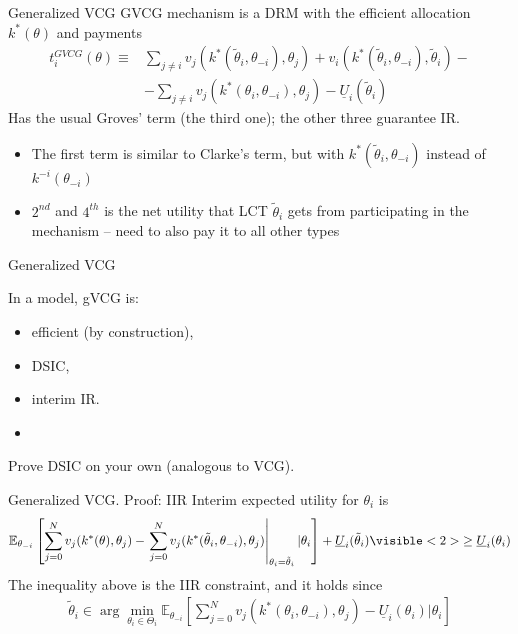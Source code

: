 \documentclass[english,10pt
,aspectratio=169
]{beamer}
\begin{document}
\begin{frame}{Generalized VCG}
	GVCG mechanism is a DRM with the efficient allocation $k^*(\theta)$ and payments
	\begin{align*}
	t_i^{GVCG} (\theta) \equiv& \sum_{j \neq i} v_j (k^*(\tilde{\theta}_i,\theta_{-i}),\theta_j) + v_i (k^*(\tilde{\theta}_i,\theta_{-i}),\tilde{\theta}_i) -
	\\& - \sum_{j \neq i} v_j (k^*(\theta_i,\theta_{-i}),\theta_j) - \underline{U}_i (\tilde{\theta}_i)
	\end{align*}
	\pause
	Has the usual Groves' term (the third one); the other three guarantee IR.
	\begin{itemize}
		\item The first term is similar to Clarke's term, but with $k^*(\tilde{\theta}_i,\theta_{-i})$ instead of $k^{-i}(\theta_{-i})$
		\item $2^{nd}$ and $4^{th}$ is the net utility that LCT $\tilde{\theta}_i$ gets from participating in the mechanism -- need to also pay it to all other types
	\end{itemize}
\end{frame}


\begin{frame}{Generalized VCG}
	\begin{theorem}
		In a  model, gVCG is:
		\begin{itemize}
			\item efficient (by construction),
			\item DSIC,
			\item interim IR.
			\item %
		\end{itemize}
	\end{theorem}
	Prove DSIC on your own (analogous to VCG).
\end{frame}


\begin{frame}{Generalized VCG. Proof: IIR}
	Interim expected utility for $\theta_i$ is
	\begin{align*}
		\mathbb{E}_{\theta_{-i}} \left[ \sum_{j =0}^N v_j (k^*(\theta),\theta_j) - \left. \sum_{j =0}^N v_j (k^*(\tilde{\theta}_i,\theta_{-i}),\theta_j) \right|_{\theta_i = \tilde{\theta}_i} | \theta_i \right] + \underline{U}_i (\tilde{\theta}_i)
		\visible<2>{
			\geq \underline{U}_i(\theta_i)
		}
	\end{align*}
	\pause
	The inequality above is the IIR constraint, and it holds since
	\begin{align*}
	\tilde{\theta}_i \in \arg \min_{\theta_i \in \Theta_i} \mathbb{E}_{\theta_{-i}} \left[ \sum_{j=0}^{N} v_j (k^*(\theta_i,\theta_{-i}),\theta_j) - \underline{U}_i (\theta_i) | \theta_i \right]
	\end{align*}
\end{frame}
\end{document}
